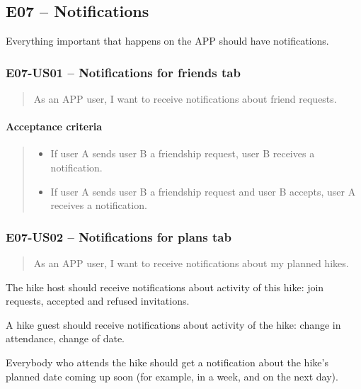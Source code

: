 \subsection*{E07 -- Notifications}
Everything important that happens on the APP should have notifications.

\subsubsection*{E07-US01 -- Notifications for friends tab}
\begin{quote}
As an APP user, I want to receive notifications about friend requests.
\end{quote}

\paragraph*{Acceptance criteria}
\begin{quote}
\begin{itemize}
    \item If user A sends user B a friendship request, user B receives a notification.
    \item If user A sends user B a friendship request and user B accepts, user A receives a notification.
\end{itemize}
\end{quote}

\subsubsection*{E07-US02 -- Notifications for plans tab}
\begin{quote}
As an APP user, I want to receive notifications about my planned hikes.
\end{quote}

The hike host should receive notifications about activity of this hike: join requests, accepted and refused invitations.

A hike guest should receive notifications about activity of the hike: change in attendance, change of date.

Everybody who attends the hike should get a notification about the hike's planned date coming up soon (for example, in a week, and on the next day).

